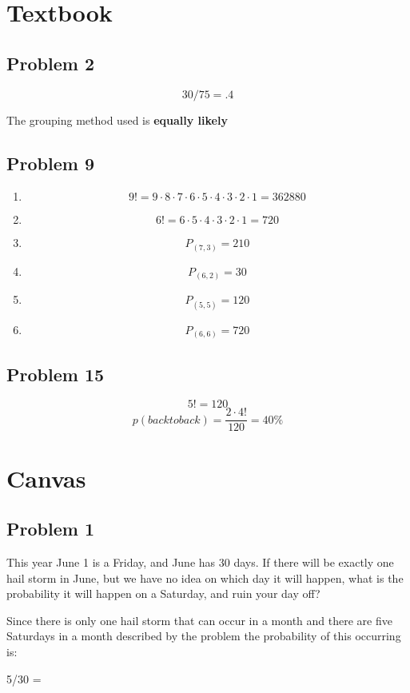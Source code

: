 \documentclass{article}
\begin{document}
\section*{Textbook}
\subsection*{Problem 2}
\begin{equation}
    30/75 = \boxed{.4}
\end{equation}
\begin{center}
    The grouping method used is \textbf{equally likely}
\end{center}
\subsection*{Problem 9}
\begin{enumerate}
    \item $$9! = 9 \cdot 8 \cdot 7 \cdot 6 \cdot 5 \cdot 4 \cdot 3 \cdot 2 \cdot 1 = \boxed{362880}$$
    \item $$6! = 6 \cdot 5 \cdot 4 \cdot 3 \cdot 2 \cdot 1 = \boxed{720}$$
    \item $$P_{(7,3)}= \boxed{210}$$
    \item $$P_{(6,2)}= \boxed{30}$$
    \item $$P_{(5,5)}= \boxed{120}$$
    \item $$P_{(6,6)}= \boxed{720}$$
\end{enumerate}
\subsection*{Problem 15}
\begin{equation}
    5! = \boxed{120}
\end{equation}
\begin{equation}
    p(back to back) = \frac{2 \cdot 4!}{120} = \boxed{40\%}
\end{equation}
\section*{Canvas}
\subsection*{Problem 1}
This year June 1 is a Friday, and June has 30 days. If there will be exactly one hail storm in June, but we have no idea on which day it will happen, what is the probability it will happen on a Saturday, and ruin your day off?
\begin{center}
    Since there is only one hail storm that can occur in a month and there are five Saturdays in a month described by the problem the probability of this occurring is:
\end{center}
\begin{center}
    5/30 = 
\end{center}
\end{document}

